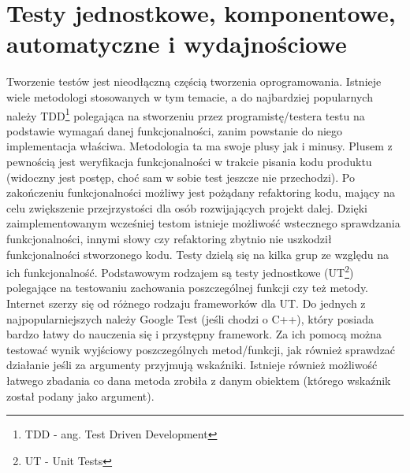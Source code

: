 \documentclass{BscUS}
\begin{document}
\section{Testy jednostkowe, komponentowe, automatyczne i wydajnościowe}
\indent Tworzenie testów jest nieodłączną częścią tworzenia oprogramowania. Istnieje wiele metodologi stosowanych w tym temacie, a do najbardziej popularnych należy TDD\footnote{TDD - ang. Test Driven Development} polegająca na stworzeniu przez programistę/testera testu na podstawie wymagań danej funkcjonalności, zanim powstanie do niego implementacja właściwa. Metodologia ta ma swoje plusy jak i minusy. Plusem z pewnością jest weryfikacja funkcjonalności w trakcie pisania kodu produktu (widoczny jest postęp, choć sam w sobie test jeszcze nie przechodzi). Po zakończeniu funkcjonalności możliwy jest pożądany refaktoring kodu, mający na celu zwiększenie przejrzystości dla osób rozwijających projekt dalej. Dzięki zaimplementowanym wcześniej testom istnieje możliwość wstecznego sprawdzania funkcjonalności, innymi słowy czy refaktoring zbytnio nie uszkodził funkcjonalności stworzonego kodu.
\newline
\indent Testy dzielą się na kilka grup ze względu na ich funkcjonalność. Podstawowym rodzajem są testy jednostkowe (UT\footnote{UT - Unit Tests}) polegające na testowaniu zachowania poszczególnej funkcji czy też metody. Internet szerzy się od różnego rodzaju frameworków dla UT. Do jednych z najpopularniejszych należy Google Test (jeśli chodzi o C++), który posiada bardzo łatwy do nauczenia się i przystępny framework. Za ich pomocą można testować wynik wyjściowy poszczególnych metod/funkcji, jak również sprawdzać działanie jeśli za argumenty przyjmują wskaźniki. Istnieje również możliwość łatwego zbadania co dana metoda zrobiła z danym obiektem (którego wskaźnik został podany jako argument).
\newline
\end{document}
